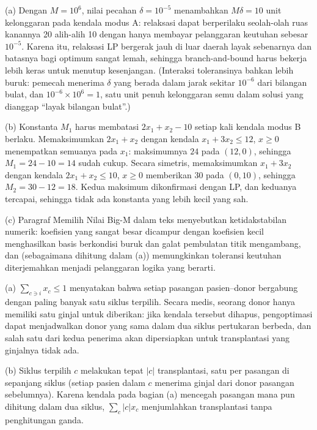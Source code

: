 
(a) Dengan $M = 10^6$, nilai pecahan $\delta = 10^{-5}$ menambahkan $M\delta = 10$ unit kelonggaran pada kendala modus A: relaksasi dapat berperilaku seolah-olah ruas kanannya 20 alih-alih 10 dengan hanya membayar pelanggaran keutuhan sebesar $10^{-5}$. Karena itu, relaksasi LP bergerak jauh di luar daerah layak sebenarnya dan batasnya bagi optimum sangat lemah, sehingga branch-and-bound harus bekerja lebih keras untuk menutup kesenjangan. (Interaksi toleransinya bahkan lebih buruk: pemecah menerima $\delta$ yang berada dalam jarak sekitar $10^{-6}$ dari bilangan bulat, dan $10^{-6} \times 10^6 = 1$, satu unit penuh kelonggaran semu dalam solusi yang dianggap ``layak bilangan bulat''.)

(b) Konstanta $M_1$ harus membatasi $2x_1 + x_2 - 10$ setiap kali kendala modus B berlaku. Memaksimumkan $2x_1 + x_2$ dengan kendala $x_1 + 3x_2 \leq 12$, $x \geq 0$ menempatkan semuanya pada $x_1$: maksimumnya $24$ pada $(12, 0)$, sehingga $M_1 = 24 - 10 = 14$ sudah cukup. Secara simetris, memaksimumkan $x_1 + 3x_2$ dengan kendala $2x_1 + x_2 \leq 10$, $x \geq 0$ memberikan $30$ pada $(0, 10)$, sehingga $M_2 = 30 - 12 = 18$. Kedua maksimum dikonfirmasi dengan LP, dan keduanya tercapai, sehingga tidak ada konstanta yang lebih kecil yang sah.

(c) Paragraf Memilih Nilai Big-M dalam teks menyebutkan ketidakstabilan numerik: koefisien yang sangat besar dicampur dengan koefisien kecil menghasilkan basis berkondisi buruk dan galat pembulatan titik mengambang, dan (sebagaimana dihitung dalam (a)) memungkinkan toleransi keutuhan diterjemahkan menjadi pelanggaran logika yang berarti.


(a) $\sum_{c \ni i} x_c \leq 1$ menyatakan bahwa setiap pasangan pasien--donor bergabung dengan paling banyak satu siklus terpilih. Secara medis, seorang donor hanya memiliki satu ginjal untuk diberikan: jika kendala tersebut dihapus, pengoptimasi dapat menjadwalkan donor yang sama dalam dua siklus pertukaran berbeda, dan salah satu dari kedua penerima akan dipersiapkan untuk transplantasi yang ginjalnya tidak ada.

(b) Siklus terpilih $c$ melakukan tepat $|c|$ transplantasi, satu per pasangan di sepanjang siklus (setiap pasien dalam $c$ menerima ginjal dari donor pasangan sebelumnya). Karena kendala pada bagian (a) mencegah pasangan mana pun dihitung dalam dua siklus, $\sum_c |c| x_c$ menjumlahkan transplantasi tanpa penghitungan ganda.

